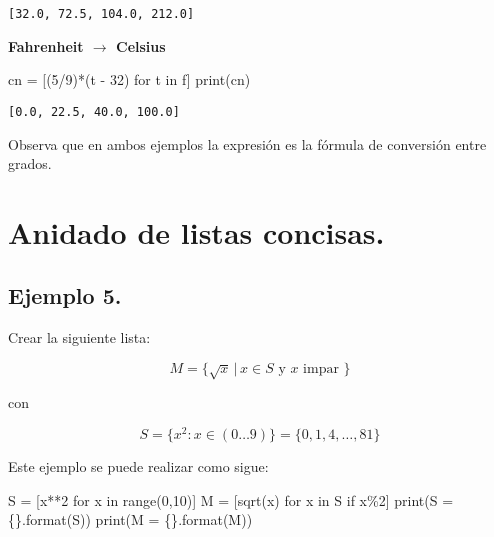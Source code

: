 \documentclass[
  letterpaper,
  DIV=11,
  numbers=noendperiod]{scrreprt}
\newenvironment{Shaded}{\begin{snugshade}}{\end{snugshade}}
\newcommand{\BuiltInTok}[1]{\textcolor[rgb]{0.00,0.23,0.31}{#1}}
\newcommand{\ControlFlowTok}[1]{\textcolor[rgb]{0.00,0.23,0.31}{#1}}
\newcommand{\DecValTok}[1]{\textcolor[rgb]{0.68,0.00,0.00}{#1}}
\newcommand{\KeywordTok}[1]{\textcolor[rgb]{0.00,0.23,0.31}{#1}}
\newcommand{\NormalTok}[1]{\textcolor[rgb]{0.00,0.23,0.31}{#1}}
\newcommand{\OperatorTok}[1]{\textcolor[rgb]{0.37,0.37,0.37}{#1}}
\newcommand{\SpecialCharTok}[1]{\textcolor[rgb]{0.37,0.37,0.37}{#1}}
\newcommand{\StringTok}[1]{\textcolor[rgb]{0.13,0.47,0.30}{#1}}
\begin{document}
\begin{verbatim}
[32.0, 72.5, 104.0, 212.0]
\end{verbatim}

\textbf{Fahrenheit \(\to\) Celsius}

\begin{Shaded}
\begin{Highlighting}[]
\NormalTok{cn }\OperatorTok{=}\NormalTok{ [(}\DecValTok{5}\OperatorTok{/}\DecValTok{9}\NormalTok{)}\OperatorTok{*}\NormalTok{(t }\OperatorTok{{-}} \DecValTok{32}\NormalTok{) }\ControlFlowTok{for}\NormalTok{ t }\KeywordTok{in}\NormalTok{ f]}
\BuiltInTok{print}\NormalTok{(cn)}
\end{Highlighting}
\end{Shaded}

\begin{verbatim}
[0.0, 22.5, 40.0, 100.0]
\end{verbatim}

Observa que en ambos ejemplos la expresión es la fórmula de conversión
entre grados.


\chapter{Anidado de listas concisas.}\label{anidado-de-listas-concisas.}

\section{\texorpdfstring{\textbf{Ejemplo
5.}}{Ejemplo 5.}}\label{ejemplo-5.-2}

Crear la siguiente lista:

\[M = \{\sqrt{x} \, |\, x \in S \text{ y } x \text{ impar }\}\]

con

\[S = \{x^2 : x \in (0 \dots 9)\} = \{0, 1, 4, \dots, 81\}\]

Este ejemplo se puede realizar como sigue:

\begin{Shaded}
\begin{Highlighting}[]
\NormalTok{S }\OperatorTok{=}\NormalTok{ [x}\OperatorTok{**}\DecValTok{2} \ControlFlowTok{for}\NormalTok{ x }\KeywordTok{in} \BuiltInTok{range}\NormalTok{(}\DecValTok{0}\NormalTok{,}\DecValTok{10}\NormalTok{)]}
\NormalTok{M }\OperatorTok{=}\NormalTok{ [sqrt(x) }\ControlFlowTok{for}\NormalTok{ x }\KeywordTok{in}\NormalTok{ S }\ControlFlowTok{if}\NormalTok{ x}\OperatorTok{\%}\DecValTok{2}\NormalTok{]}
\BuiltInTok{print}\NormalTok{(}\StringTok{\textquotesingle{}S = }\SpecialCharTok{\{\}}\StringTok{\textquotesingle{}}\NormalTok{.}\BuiltInTok{format}\NormalTok{(S))}
\BuiltInTok{print}\NormalTok{(}\StringTok{\textquotesingle{}M = }\SpecialCharTok{\{\}}\StringTok{\textquotesingle{}}\NormalTok{.}\BuiltInTok{format}\NormalTok{(M))}
\end{Highlighting}
\end{Shaded}
\end{document}
